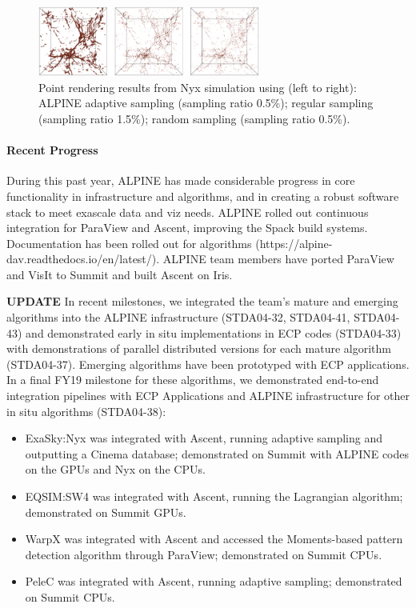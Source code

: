 \begin{figure}[htb]
	\begin{center}
		\includegraphics[width=0.65\textwidth]{projects/2.3.4-DataViz/2.3.4.16-ALPINE-ZFP/alpine_nyxSamplingExample.png}
		\caption{Point rendering results from Nyx simulation using (left to right):  ALPINE adaptive sampling  (sampling ratio 0.5\%); regular sampling  (sampling ratio 1.5\%); random sampling  (sampling ratio 0.5\%).}
		\label{fig:alpine-sampling-example}
	\end{center}
\end{figure}

\paragraph{Recent Progress}

During this past year, ALPINE has made considerable progress in core functionality in infrastructure and algorithms, and in creating a robust software stack to meet exascale data and viz needs.  ALPINE rolled out continuous integration for ParaView and Ascent, improving the Spack build systems.  Documentation has been rolled out for algorithms (https://alpine-dav.readthedocs.io/en/latest/).  ALPINE team members have ported ParaView and VisIt to Summit and built Ascent on Iris.  

\textbf{UPDATE}
In recent milestones, we integrated the team’s mature and emerging algorithms into the ALPINE infrastructure (STDA04-32, STDA04-41, STDA04-43) and demonstrated early in situ implementations in ECP codes (STDA04-33) with demonstrations of parallel distributed versions for each mature algorithm (STDA04-37).  Emerging algorithms have been prototyped with ECP applications.  
In a final FY19 milestone for these algorithms, we demonstrated end-to-end integration pipelines with ECP Applications and ALPINE infrastructure for other in situ algorithms (STDA04-38):

\begin{itemize}  
	\setlength{\itemsep}{1pt}
	\setlength{\parskip}{0pt}
	\setlength{\parsep}{0pt}
	\item ExaSky:Nyx was integrated with Ascent, running adaptive sampling and outputting a Cinema database; demonstrated on Summit with ALPINE codes on the GPUs and Nyx on the CPUs. 
	\item EQSIM:SW4 was integrated with Ascent, running the Lagrangian algorithm; demonstrated on Summit GPUs.  
	\item WarpX was integrated with Ascent and accessed the Moments-based pattern detection algorithm through ParaView; demonstrated on Summit CPUs.
	\item PeleC was integrated with Ascent, running adaptive sampling; demonstrated on Summit CPUs.
\end{itemize}


